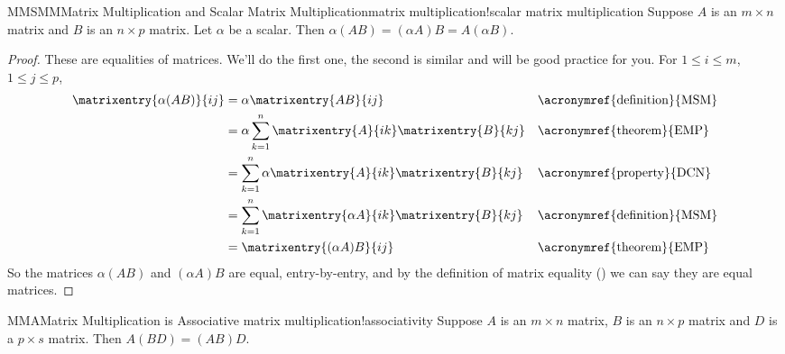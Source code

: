 %
\begin{theorem}{MMSMM}{Matrix Multiplication and Scalar Matrix Multiplication}{matrix multiplication!scalar matrix multiplication}
Suppose $A$ is an $m\times n$ matrix and $B$ is an $n\times p$ matrix.  Let $\alpha$ be a scalar.  Then $\alpha(AB)=(\alpha A)B=A(\alpha B)$.
\end{theorem}
%
\begin{proof}
These are equalities of matrices.  We'll do the first one, the second is similar and will be good practice for you.    For $1\leq i\leq m$, $1\leq j\leq p$,
%
\begin{align*}
\matrixentry{\alpha(AB)}{ij}
&=\alpha\matrixentry{AB}{ij}&&\text{\acronymref{definition}{MSM}}\\
&=\alpha\sum_{k=1}^{n}\matrixentry{A}{ik}\matrixentry{B}{kj}&&\text{\acronymref{theorem}{EMP}}\\
&=\sum_{k=1}^{n}\alpha\matrixentry{A}{ik}\matrixentry{B}{kj}&&\text{\acronymref{property}{DCN}}\\
&=\sum_{k=1}^{n}\matrixentry{\alpha A}{ik}\matrixentry{B}{kj}&&\text{\acronymref{definition}{MSM}}\\
&=\matrixentry{(\alpha A)B}{ij}&&\text{\acronymref{theorem}{EMP}}
\end{align*}
%
So the matrices $\alpha(AB)$ and $(\alpha A)B$ are equal, entry-by-entry, and by the definition of matrix equality () we can say they are equal matrices.
\end{proof}
%
\begin{theorem}{MMA}{Matrix Multiplication is Associative }{matrix multiplication!associativity}
Suppose $A$ is an $m\times n$ matrix, $B$ is an $n\times p$ matrix and $D$ is a $p\times s$ matrix.  Then  $A(BD)=(AB)D$.
\end{theorem}
%
